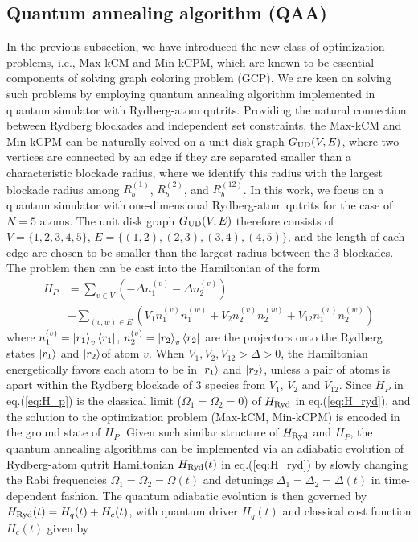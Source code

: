 \documentclass[%
 reprint,
nofootinbib,
 amsmath,amssymb,
 aps,
pra,
floatfix,
]{revtex4-2}
\begin{document}
\subsection{Quantum annealing algorithm (QAA)}

In the previous subsection, we have introduced the new class of optimization problems, i.e., Max-kCM and Min-kCPM, which are known to be essential components of solving graph coloring problem (GCP). We are keen on solving such problems by employing quantum annealing algorithm implemented in quantum simulator with Rydberg-atom qutrits. Providing the natural connection between Rydberg blockades and independent set constraints, the Max-kCM and Min-kCPM can be naturally solved on a unit disk graph $G_{\rm UD}(V,E)$, where two vertices are connected by an edge if they are separated smaller than a characteristic blockade radius, where we identify this radius with the largest blockade radius among $R^{(1)}_b$, $R^{(2)}_b$, and $R^{(12)}_b$. In this work, we focus on a quantum simulator with one-dimensional Rydberg-atom qutrits for the case of $N=5$ atoms. The unit disk graph $G_{\rm UD}(V,E)$ therefore consists of $V=\{1,2,3,4,5\}$, $E=\{(1,2),(2,3),(3,4),(4,5)\}$, and the length of each edge are chosen to be smaller than the largest radius between the 3 blockades. The problem then can be cast into the Hamiltonian of the form 
\begin{align}\label{eq:H_p}
H_{P}  &= \sum_{v \in V} (- \Delta n^{(v)}_1  - \Delta n^{(v)}_2) \nonumber \\ 
&+ \sum_{(v,w) \in E} (V_1 n^{(v)}_1 n^{(w)}_1  + V_2 n^{(v)}_2 n^{(w)}_2 + V_{12} n^{(v)}_1 n^{(w)}_2)
\end{align}
where $n^{(v)}_1 = \ket{r_1}_v \bra{r_1}$, $n^{(v)}_2 = \ket{r_2}_v \bra{r_2}$ are the projectors onto the Rydberg states $\ket{r_1}$ and $\ket{r_2}$of atom $v$. When $ V_1, V_2, V_{12} > \Delta > 0$, the Hamiltonian energetically favors each atom to be in $\ket{r_1}$ and $\ket{r_2}$, unless a pair of atoms is apart within the Rydberg blockade of 3 species from $V_1$, $V_2$ and $V_{12}$. Since $H_P$ in eq.(\ref{eq:H_p}) is the classical limit ($\Omega_1 = \Omega_2 =0$) of $H_{\rm Ryd}$ in eq.(\ref{eq:H_ryd}), and the solution to the optimization problem (Max-kCM, Min-kCPM) is encoded in the ground state of $H_P$. Given such similar structure of $H_{\rm Ryd}$ and $H_P$, the quantum annealing algorithms can be implemented via an adiabatic evolution of Rydberg-atom qutrit Hamiltonian $H_{\rm Ryd}(t)$ in eq.(\ref{eq:H_ryd}) by slowly changing the Rabi frequencies $\Omega_1 = \Omega_2 = \Omega(t)$ and detunings $\Delta_1 = \Delta_2 = \Delta(t)$ in time-dependent fashion. The quantum adiabatic evolution is then governed by $H_{\rm Ryd}(t) = H_q(t) + H_c(t)$, with quantum driver $H_q(t)$ and classical cost function $H_c(t)$ given by
\end{document}
